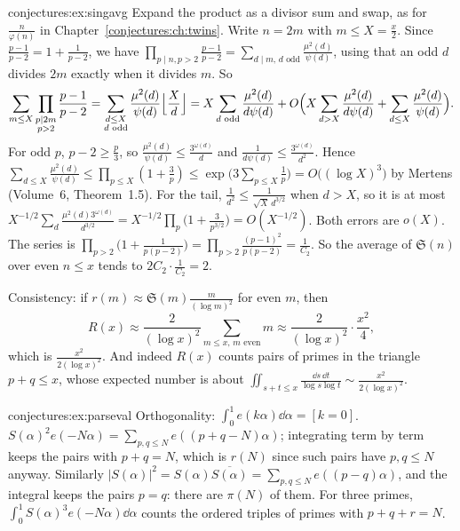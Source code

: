 \begin{solution}{conjectures:ex:singavg}
\idea Expand the product as a divisor sum and swap, as for $\frac n{\varphi(n)}$ in Chapter~\ref{conjectures:ch:twins}.
\writeup Write $n=2m$ with $m\le X=\frac x2$. Since $\frac{p-1}{p-2}=1+\frac1{p-2}$, we have $\prod_{p\mid n,p>2}\frac{p-1}{p-2}=\sum_{d\mid m,\,d\text{ odd}}\frac{\mu^2(d)}{\psi(d)}$,
using that an odd $d$ divides $2m$ exactly when it divides $m$. So
\[
\sum_{m\le X}\prod_{\substack{p\mid2m\\p>2}}\frac{p-1}{p-2}=\sum_{\substack{d\le X\\d\text{ odd}}}\frac{\mu^2(d)}{\psi(d)}\Bigl\lfloor\frac Xd\Bigr\rfloor=X\sum_{d\text{ odd}}\frac{\mu^2(d)}{d\psi(d)}+O\Bigl(X\sum_{d>X}\frac{\mu^2(d)}{d\psi(d)}+\sum_{d\le X}\frac{\mu^2(d)}{\psi(d)}\Bigr).
\]
For odd $p$, $p-2\ge\frac p3$, so $\frac{\mu^2(d)}{\psi(d)}\le\frac{3^{\omega(d)}}d$ and $\frac1{d\psi(d)}\le\frac{3^{\omega(d)}}{d^2}$. Hence
$\sum_{d\le X}\frac{\mu^2(d)}{\psi(d)}\le\prod_{p\le X}(1+\frac3p)\le\exp\bigl(3\sum_{p\le X}\frac1p\bigr)=O\bigl((\log X)^3\bigr)$ by Mertens (Volume~6,
Theorem~1.5). For the tail, $\frac1{d^2}\le\frac1{\sqrt X\,d^{3/2}}$ when $d>X$, so it is at most
$X^{-1/2}\sum_d\frac{\mu^2(d)3^{\omega(d)}}{d^{3/2}}=X^{-1/2}\prod_p\bigl(1+\frac3{p^{3/2}}\bigr)=O(X^{-1/2})$. Both errors are $o(X)$. The series is
$\prod_{p>2}\bigl(1+\frac1{p(p-2)}\bigr)=\prod_{p>2}\frac{(p-1)^2}{p(p-2)}=\frac1{C_2}$. So the average of $\mathfrak S(n)$ over even $n\le x$ tends to
$2C_2\cdot\frac1{C_2}=2$.

Consistency: if $r(m)\approx\mathfrak S(m)\frac m{(\log m)^2}$ for even $m$, then
\[
R(x)\approx\frac2{(\log x)^2}\sum_{m\le x,\,m\text{ even}}m\approx\frac2{(\log x)^2}\cdot\frac{x^2}4,
\]
which is $\frac{x^2}{2(\log x)^2}$. And indeed $R(x)$ counts pairs of primes in the triangle $p+q\le x$, whose expected number is about
$\iint_{s+t\le x}\frac{\dd s\,\dd t}{\log s\log t}\sim\frac{x^2}{2(\log x)^2}$.
\end{solution}

\begin{solution}{conjectures:ex:parseval}
\idea Orthogonality: $\int_0^1e(k\alpha)\dd\alpha=[k=0]$.
\writeup $S(\alpha)^2e(-N\alpha)=\sum_{p,q\le N}e((p+q-N)\alpha)$; integrating term by term keeps the pairs with $p+q=N$, which is $r(N)$ since such pairs have
$p,q\le N$ anyway. Similarly $|S(\alpha)|^2=S(\alpha)\overline{S(\alpha)}=\sum_{p,q\le N}e((p-q)\alpha)$, and the integral keeps the pairs $p=q$: there are
$\pi(N)$ of them. For three primes, $\int_0^1S(\alpha)^3e(-N\alpha)\dd\alpha$ counts the ordered triples of primes with $p+q+r=N$.
\end{solution}

